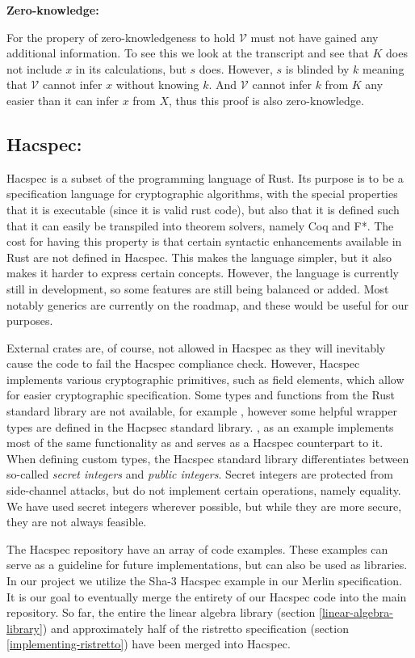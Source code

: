 \documentclass{article}
\newcommand*\ttvar[1]{\texttt{\expandafter\dottvar\detokenize{#1}\relax}}
\newcommand*\dottvar[1]{\ifx\relax#1\else
  \expandafter\ifx\string_#1\string_\allowbreak\else#1\fi
  \expandafter\dottvar\fi}
\newcommand{\V}{\mathcal{V}}
\begin{document}
\textbf{Zero-knowledge:}

For the propery of zero-knowledgeness to hold $\V$ must not have gained
any additional information. To see this we look at the transcript
and see that $K$ does not include $x$ in its calculations, but $s$
does. However, $s$ is blinded by $k$ meaning that $\V$ cannot infer
$x$ without knowing $k$. And $\V$ cannot infer $k$ from $K$ any easier
than it can infer $x$ from $X$, thus this proof is also zero-knowledge.

\subsection{Hacspec:} \label{hacspec}

Hacspec is a subset of the programming language of Rust. Its purpose is
to be a specification language for cryptographic algorithms, with the
special properties that it is executable (since it is valid rust code),
but also that it is defined such that it can easily be transpiled into
theorem solvers, namely Coq and F*. The cost for having this property
is that certain syntactic enhancements available in Rust are not
defined in Hacspec. This makes the language simpler, but it also makes
it harder to express certain concepts. However, the language is 
currently still in development, so some features are still being 
balanced or added. Most notably generics are currently on the roadmap, 
and these would be useful for our purposes.

External crates are, of course, not allowed in Hacspec as they will 
inevitably cause the code to fail the Hacspec compliance check. 
However, Hacspec implements various cryptographic primitives, such as 
field elements, which allow for easier cryptographic specification. 
Some types and functions from the Rust standard library are not 
available, for example \ttvar{Vec<T>}, however some helpful wrapper 
types are defined in the Hacpsec standard library. \ttvar{Seq<T>}, 
as an example implements most of the same functionality as 
\ttvar{Vec<T>} and serves as a Hacspec counterpart to it. When 
defining custom types, the Hacspec standard library differentiates 
between so-called \textit{secret integers} and \textit{public integers}.
Secret integers are protected from side-channel attacks, but do not 
implement certain operations, namely equality. We have used secret 
integers wherever possible, but while they are more secure, they are 
not always feasible.

The Hacspec repository have an array of code examples. These examples
can serve as a guideline for future implementations, but can also
be used as libraries. In our project we utilize the Sha-3 Hacspec
example in our Merlin specification. It is our goal to eventually merge 
the entirety of our Hacspec code into the main repository. So far, the
entire the linear algebra library (section \ref{linear-algebra-library})
and approximately half of the ristretto specification (section
\ref{implementing-ristretto}) have been merged into Hacspec.
\end{document}
